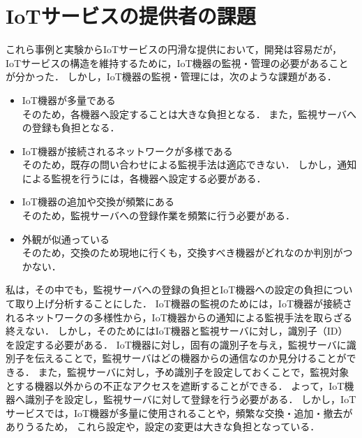 \section{IoTサービスの提供者の課題}
これら事例と実験からIoTサービスの円滑な提供において，開発は容易だが，IoTサービスの構造を維持するために，IoT機器の監視・管理の必要があることが分かった．
しかし，IoT機器の監視・管理には，次のような課題がある．
\begin{itemize}
\item IoT機器が多量である\\
	そのため，各機器へ設定することは大きな負担となる．
	また，監視サーバへの登録も負担となる．
\item IoT機器が接続されるネットワークが多様である\\
	そのため，既存の問い合わせによる監視手法は適応できない．
	しかし，通知による監視を行うには，各機器へ設定する必要がある．
\item IoT機器の追加や交換が頻繁にある\\
	そのため，監視サーバへの登録作業を頻繁に行う必要がある．
\item 外観が似通っている\\
	そのため，交換のため現地に行くも，交換すべき機器がどれなのか判別がつかない．
\end{itemize}


私は，その中でも，監視サーバへの登録の負担とIoT機器への設定の負担について取り上げ分析することにした．
IoT機器の監視のためには，IoT機器が接続されるネットワークの多様性から，IoT機器からの通知による監視手法を取らざる終えない．
しかし，そのためにはIoT機器と監視サーバに対し，識別子（ID）を設定する必要がある．
IoT機器に対し，固有の識別子を与え，監視サーバに識別子を伝えることで，監視サーバはどの機器からの通信なのか見分けることができる．
また，監視サーバに対し，予め識別子を設定しておくことで，監視対象とする機器以外からの不正なアクセスを遮断することができる．
よって，IoT機器へ識別子を設定し，監視サーバに対して登録を行う必要がある．
しかし，IoTサービスでは，IoT機器が多量に使用されることや，頻繁な交換・追加・撤去がありうるため，
これら設定や，設定の変更は大きな負担となっている．


